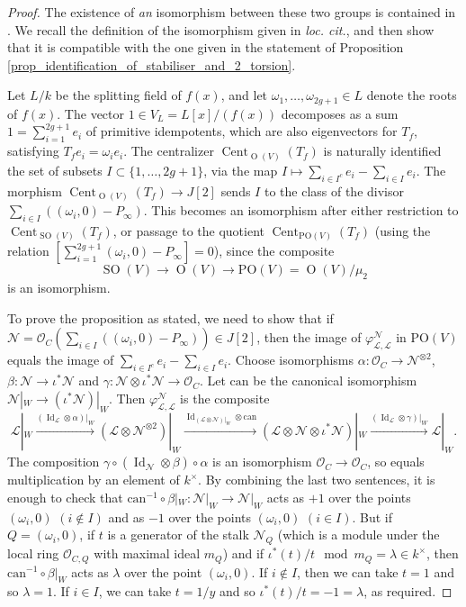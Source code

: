 \documentclass{article} %
\numberwithin{equation}{section}
\DeclareMathOperator{\SO}{SO}
\DeclareMathOperator{\OO}{O}
\DeclareMathOperator{\Id}{Id}
\newcommand{\sh}[1]{\mathscr{#1}}
\renewcommand{\O}{\mathcal{O}}
\newcommand{\cO}{\mathcal{O}}
\begin{document}
\begin{proof}
The existence of \emph{an} isomorphism between these two groups is contained in \cite[Proposition 11]{BhargavaGross}. We recall the definition of the isomorphism given in \emph{loc. cit.}, and then show that it is compatible with the one given in the statement of Proposition \ref{prop_identification_of_stabiliser_and_2_torsion}. 

Let $L / k$ be the splitting field of $f(x)$, and let $\omega_1, \dots, \omega_{2g+1} \in L$ denote the roots of $f(x)$. The vector $1 \in V_L = L[x] / (f(x))$ decomposes as a sum $1 = \sum_{i=1}^{2g+1} e_i$ of primitive idempotents, which are also eigenvectors for $T_f$, satisfying $T_f e_i = \omega_i e_i$. The centralizer $\operatorname{Cent}_{\OO(V)}(T_f)$ is naturally identified the set of subsets $I \subset \{ 1, \dots, 2g+1\}$, via the map $I \mapsto \sum_{i \in I^c} e_i - \sum_{i \in I} e_i$. The morphism $\operatorname{Cent}_{\OO(V)}(T_f) \to J[2]$ sends $I$ to the  class of the divisor $\sum_{i \in I} \left( (\omega_i, 0) - P_\infty \right)$. This becomes an isomorphism after either restriction to $\operatorname{Cent}_{\SO(V)}(T_f)$, or passage to the quotient $\operatorname{Cent}_{\mathrm{PO}(V)}(T_f)$ (using the relation $[\sum_{i=1}^{2g+1} (\omega_i, 0) - P_\infty] = 0$), since the composite
\[ \SO(V) \to \OO(V) \to \mathrm{PO}(V) = \OO(V) / \mu_2 \]
is an isomorphism. 

    To prove the proposition as stated, we need to show that if $\sh{N} = \cO_C(\sum_{i \in I} ((\omega_i, 0) - P_\infty)) \in J[2]$, then the image of $\varphi^{\sh{N}}_{\sh{L}, \sh{L}}$ in $\mathrm{PO}(V)$ equals the image of $\sum_{i \in I^c} e_i - \sum_{i \in I} e_i$.
    Choose isomorphisms
    $\alpha\colon \O_C\rightarrow \sh{N}^{\otimes2}$, $\beta\colon \sh{N} \rightarrow \iota^*\sh{N}$ and $\gamma\colon \sh{N} \otimes \iota^*\sh{N}\rightarrow \O_C$.
    Let $\mathrm{can}$ be the canonical isomorphism $\sh{N}|_W \rightarrow (\iota^*\sh{N})|_W$.
    Then $\varphi_{\sh{L}, \sh{L}}^{\sh{N}}$ is the composite
    \[
    \sh{L}|_W 
    \xrightarrow{(\Id_{\sh{L}}\otimes \alpha)|_W} (\sh{L}\otimes \sh{N}^{\otimes 2})|_W
    \xrightarrow{\Id_{(\sh{L}\otimes \sh{N})|_W} \otimes \mathrm{can}}
    (\sh{L}\otimes \sh{N}\otimes \iota^*\sh{N})|_W
    \xrightarrow{(\Id_{\sh{L}}\otimes \gamma)|_W}
    \sh{L}|_W.
    \]
    The composition $\gamma\circ (\Id_{\sh{N}}\otimes \beta) \circ \alpha$ is an isomorphism $\O_C\rightarrow \O_C$, so equals multiplication by an element of $k^{\times}$.
    By combining the last two sentences, it is enough to check that $\mathrm{can}^{-1} \circ \beta|_W \colon \sh{N}|_W\rightarrow \sh{N}|_W$ acts as $+1$ over the points $(\omega_i,0)$ $(i\not\in I)$ and as $-1$ over the points $(\omega_i,0)$ $(i\in I)$.
    But if $Q = (\omega_i, 0)$, if $t$ is a generator of the stalk $\sh{N}_Q$ (which is a module under the local ring $\O_{C, Q}$ with maximal ideal $m_Q$) and if $\iota^*(t)/t \mod m_Q = \lambda \in k^{\times}$, then $\mathrm{can}^{-1} \circ \beta|_W$ acts as $\lambda$ over the point $(\omega_i, 0)$.
    If $i\not \in  I$, then we can take $t = 1$ and so $\lambda = 1$.
    If $i\in I$, we can take $t = 1/y$ and so $\iota^*(t)/t = -1 = \lambda$, as required.
\end{proof}
\end{document}
